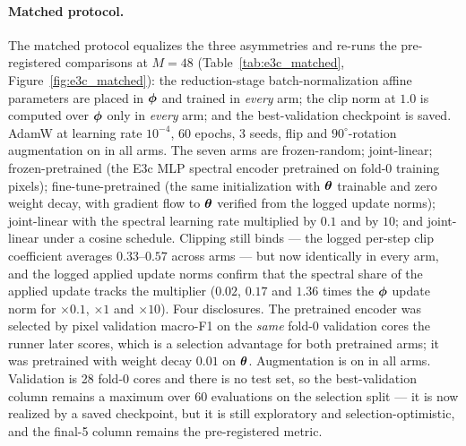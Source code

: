 \paragraph{Matched protocol.}
The matched protocol equalizes the three asymmetries and re-runs the
pre-registered comparisons at $M{=}48$ (Table~\ref{tab:e3c_matched},
Figure~\ref{fig:e3c_matched}):
the reduction-stage
batch-nor\-mal\-i\-za\-tion affine parameters are placed in ${\boldsymbol{\phi}}$ and
trained in \emph{every} arm; the clip norm at $1.0$ is computed over
${\boldsymbol{\phi}}$ only in \emph{every} arm; and the best-validation checkpoint is
saved. AdamW at learning rate $10^{-4}$, 60 epochs, 3 seeds, flip and
$90^\circ$-rotation augmentation on in all arms. The seven arms are
frozen-random; joint-linear; frozen-pretrained (the E3c MLP spectral
encoder pretrained on fold-0 training pixels); fine-tune-pretrained
(the same initialization with ${\boldsymbol{\theta}}$ trainable and zero weight
decay, with gradient flow to ${\boldsymbol{\theta}}$ verified from the logged update
norms); joint-linear with the spectral learning rate multiplied by
$0.1$ and by $10$; and joint-linear under a cosine schedule. Clipping
still binds --- the logged per-step clip coefficient averages
$0.33$--$0.57$ across arms --- but now identically in every arm, and
the logged applied update norms confirm that the spectral share of the
applied update tracks the multiplier ($0.02$, $0.17$ and $1.36$ times
the ${\boldsymbol{\phi}}$ update norm for $\times 0.1$, $\times 1$ and $\times 10$).
Four disclosures. The pretrained encoder was selected by pixel
validation macro-F1 on the \emph{same} fold-0 validation cores the
runner later scores, which is a selection advantage for both
pretrained arms; it was pretrained with weight decay $0.01$ on
${\boldsymbol{\theta}}$. Augmentation is on in all arms. Validation is 28 fold-0
cores and there is no test set, so the best-validation column remains a
maximum over 60 evaluations on the selection split --- it is now
realized by a saved checkpoint, but it is still exploratory and
selection-optimistic, and the final-5 column remains the pre-registered
metric.


